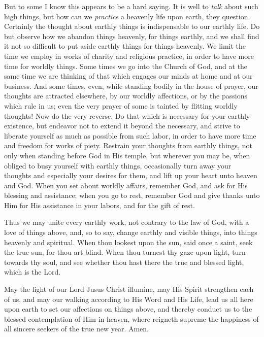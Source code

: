 But to some I know this appears to be a hard 
saying. It is well to \textit{talk} about such high 
things, but how can we \textit{practice} a heavenly life 
upon earth, they question. Certainly the 
thought about earthly things is indispensable to 
our earthly life. Do but observe how we 
abandon things heavenly, for things earthly, 
and we shall find it not so difficult to put aside 
earthly things for things heavenly. We limit 
the time we employ in works of charity and 
religious practice, in order to have more time 
for worldly things. Some times we go into the 
Church of God, and at the same time we are 
thinking of that which engages our minds at 
home and at our business. And some times, 
even, while standing bodily in the house of 
prayer, our thoughts are attracted elsewhere, 
by our worldly affections, or by the passions 
which rule in us; even the very prayer of some 
is tainted by flitting worldly thoughts! Now do 
the very reverse. Do that which is necessary
for your earthly existence, but endeavor not to 
extend it beyond the necessary, and strive to 
liberate yourself as much as possible from such 
labor, in order to have more time and freedom 
for works of piety. Restrain your thoughts 
from earthly things, not only when standing 
before God in His temple, but wherever you 
may be, when obliged to busy yourself with 
earthly things, occasionally turn away your 
thoughts and especially your desires for them, 
and lift up your heart unto heaven and God. 
When you set about worldly affairs, remember 
God, and ask for His blessing and assistance; 
when you go to rest, remember God and give 
thanks unto Him for His assistance in your 
labors, and for the gift of rest. 

Thus we may unite every earthly work, not 
contrary to the law of God, with a love of things 
above, and, so to say, change earthly and visible 
things, into things heavenly and spiritual. 
When thou lookest upon the sun, said once a 
saint, seek the true sun, for thou art blind. 
When thou turnest thy gaze upon light, turn 
towards thy soul, and see whether thou hast 
there the true and blessed light, which is the 
Lord. 

May the light of our Lord Jusus Christ illumine,
may His Spirit strengthen each of us, 
and may our walking according to His Word 
and His Life, lead us all here upon earth to set 
our affections on things above, and thereby conduct
us to the blessed contemplation of Him in 
heaven, where reigneth supreme the happiness 
of all sincere seekers of the true new year. Amen.

